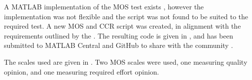 A MATLAB implementation of the \ac{MOS} test exists \citep{Ruzanski2009},
however the implementation was not flexible and the script was not
found to be suited to the required test. A new \ac{MOS} and \ac{CCR}
script was created, in alignment with the requirements outlined by
the \citet{InternationalTelecommunicationUnion1996}. The resulting
code is given in , and has been submitted
to MATLAB Central and GitHub to share with the community \citep{Gillman2014}.

The scales used are given in . Two \ac{MOS}
scales were used, one measuring quality opinion, and one measuring
required effort opinion.

\begin{table}[h]
\protect\caption{\label{tab:MOS-CCR-Scales}Scales used in subjective tests}


\begin{centering}
\par\end{centering}

\begin{centering}
\par\end{centering}


\end{table}
